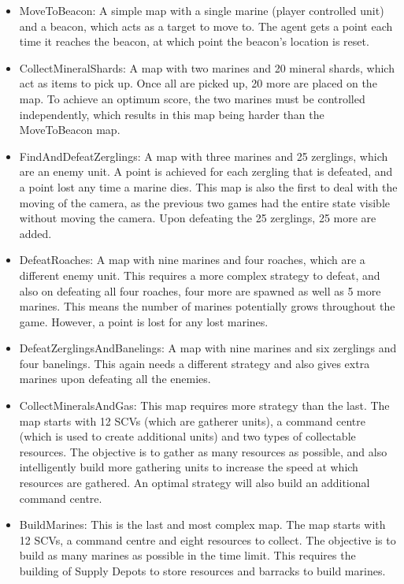 \begin{itemize}
    \item MoveToBeacon: A simple map with a single marine (player controlled
        unit) and a beacon, which acts as a target to move to. The agent gets
        a point each time it reaches the beacon, at which point the beacon's
        location is reset.
    \item CollectMineralShards: A map with two marines and 20 mineral shards,
        which act as items to pick up. Once all are picked up, 20 more are
        placed on the map. To achieve an optimum score, the two marines must
        be controlled independently, which results in this map being
        harder than the MoveToBeacon map.
    \item FindAndDefeatZerglings: A map with three marines and 25 zerglings,
        which are an enemy unit. A point is achieved for each zergling that
        is defeated, and a point lost any time a marine dies. This map
        is also the first to deal with the moving of the camera, as the previous
        two games had the entire state visible without moving the camera.
        Upon defeating the 25 zerglings, 25 more are added.
    \item DefeatRoaches: A map with nine marines and four roaches, which are a
        different enemy unit. This requires a more complex strategy to defeat,
        and also on defeating all four roaches, four more are spawned as well as 5
        more marines. This means the number of marines potentially grows
        throughout the game. However, a point is lost for any lost marines.
    \item DefeatZerglingsAndBanelings: A map with nine marines and six zerglings
        and four banelings. This again needs a different strategy and also gives
        extra marines upon defeating all the enemies.
    \item CollectMineralsAndGas: This map requires more strategy than the last.
        The map starts with 12 SCVs (which are gatherer units), a command centre
        (which is used to create additional units) and two types of collectable
        resources. The objective is to gather as many resources as possible, and
        also intelligently build more gathering units to increase the
        speed at which resources are gathered. An optimal strategy will also
        build an additional command centre.
    \item BuildMarines: This is the last and most complex map. The map starts
        with 12 SCVs, a command centre and eight resources to collect. The
        objective is to build as many marines as possible in the time limit.
        This requires the building of Supply Depots to store resources and
        barracks to build marines.
\end{itemize}

